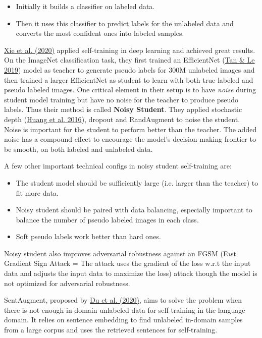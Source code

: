 \begin{itemize}
\tightlist
\item
  Initially it builds a classifier on labeled data.
\item
  Then it uses this classifier to predict labels for the unlabeled data and converts the most confident ones into labeled samples.
\end{itemize}

\href{https://arxiv.org/abs/1911.04252}{Xie et al. (2020)} applied self-training in deep learning and achieved great results. On the ImageNet classification task, they first trained an EfficientNet (\href{https://arxiv.org/abs/1905.11946}{Tan \& Le 2019}) model as teacher to generate pseudo labels for 300M unlabeled images and then trained a larger EfficientNet as student to learn with both true labeled and pseudo labeled images. One critical element in their setup is to have \emph{noise} during student model training but have no noise for the teacher to produce pseudo labels. Thus their method is called \textbf{Noisy Student}. They applied stochastic depth (\href{https://arxiv.org/abs/1603.09382}{Huang et al. 2016}), dropout and RandAugment to noise the student. Noise is important for the student to perform better than the teacher. The added noise has a compound effect to encourage the model's decision making frontier to be smooth, on both labeled and unlabeled data.

A few other important technical configs in noisy student self-training are:

\begin{itemize}
\tightlist
\item
  The student model should be sufficiently large (i.e. larger than the teacher) to fit more data.
\item
  Noisy student should be paired with data balancing, especially important to balance the number of pseudo labeled images in each class.
\item
  Soft pseudo labels work better than hard ones.
\end{itemize}

Noisy student also improves adversarial robustness against an FGSM (Fast Gradient Sign Attack = The attack uses the gradient of the loss w.r.t the input data and adjusts the input data to maximize the loss) attack though the model is not optimized for adversarial robustness.

SentAugment, proposed by \href{https://arxiv.org/abs/2010.02194}{Du et al. (2020)}, aims to solve the problem when there is not enough in-domain unlabeled data for self-training in the language domain. It relies on sentence embedding to find unlabeled in-domain samples from a large corpus and uses the retrieved sentences for self-training.

